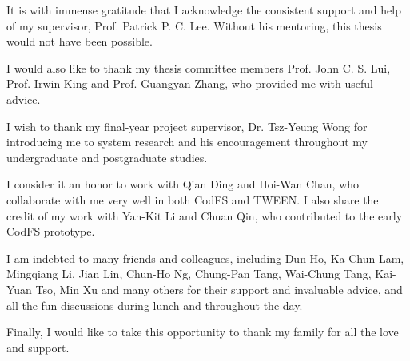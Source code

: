 It is with immense gratitude that I acknowledge the consistent support and help
of my supervisor, Prof. Patrick P. C. Lee. Without his mentoring, this thesis
would not have been possible.

I would also like to thank my thesis committee members Prof. John C. S. Lui,
Prof. Irwin King and Prof. Guangyan Zhang, who provided me with useful advice.

I wish to thank my final-year project supervisor, Dr. Tsz-Yeung Wong for
introducing me to system research and his encouragement throughout my
undergraduate and postgraduate studies.

I consider it an honor to work with Qian Ding and Hoi-Wan Chan, who collaborate
with me very well in both CodFS and TWEEN. I also share the credit of my work
with Yan-Kit Li and Chuan Qin, who contributed to the early CodFS prototype.  

I am indebted to many friends and colleagues, including Dun Ho, Ka-Chun Lam, Mingqiang Li,
Jian Lin, Chun-Ho Ng, Chung-Pan Tang, Wai-Chung Tang, Kai-Yuan Tso, Min Xu and
many others for their support and invaluable advice, and all the fun discussions
during lunch and throughout the day. 

Finally, I would like to take this opportunity to thank my family for all the
love and support.

